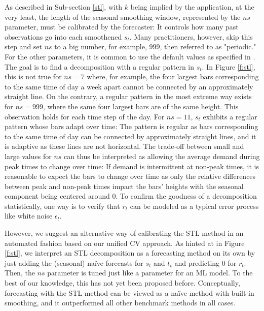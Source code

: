 As described in Sub-section \ref{stl}, with $k$ being implied by the
    application, at the very least, the length of the seasonal smoothing
    window, represented by the $ns$ parameter, must be calibrated by the
    forecaster:
It controls how many past observations go into each smoothened $s_t$.
Many practitioners, however, skip this step and set $ns$ to a big number, for
    example, $999$, then referred to as "periodic."
For the other parameters, it is common to use the default values as
    specified in \cite{cleveland1990}.
The goal is to find a decomposition with a regular pattern in $s_t$.
In Figure \ref{f:stl}, this is not true for $ns=7$ where, for
    example, the four largest bars corresponding to the same time of day a
    week apart cannot be connected by an approximately straight line.
On the contrary, a regular pattern in the most extreme way exists for
    $ns=999$, where the same four largest bars are of the same height.
This observation holds for each time step of the day.
For $ns=11$, $s_t$ exhibits a regular pattern whose bars adapt over time:
The pattern is regular as bars corresponding to the same time of day can be
    connected by approximately straight lines, and it is adaptive as these
    lines are not horizontal.
The trade-off between small and large values for $ns$ can thus be interpreted
    as allowing the average demand during peak times to change over time:
If demand is intermittent at non-peak times, it is reasonable to expect the
    bars to change over time as only the relative differences between peak and
    non-peak times impact the bars' heights with the seasonal component being
    centered around $0$.
To confirm the goodness of a decomposition statistically, one way is to verify
    that $r_t$ can be modeled as a typical error process like white noise
    $\epsilon_t$.

However, we suggest an alternative way of calibrating the STL method in an
    automated fashion based on our unified CV approach.
As hinted at in Figure \ref{f:stl}, we interpret an STL decomposition as a
    forecasting method on its own by just adding the (seasonal) na\"{i}ve
    forecasts for $s_t$ and $t_t$ and predicting $0$ for $r_t$.
Then, the $ns$ parameter is tuned just like a parameter for an ML model.
To the best of our knowledge, this has not yet been proposed before.
Conceptually, forecasting with the STL method can be viewed as a na\"{i}ve
    method with built-in smoothing, and it outperformed all other
    benchmark methods in all cases.

